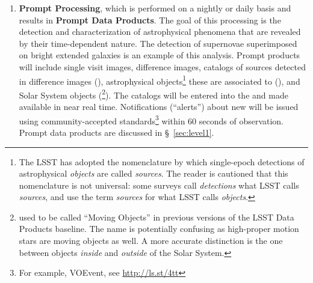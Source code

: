 \begin{enumerate}
    \item \textbf{Prompt Processing}, which is performed on a nightly or daily basis and results in \textbf{Prompt Data Products}. The goal of this processing is the detection and characterization of astrophysical phenomena that are revealed by their time-dependent nature. The detection of supernovae superimposed on bright extended galaxies is an example of this analysis.  Prompt products will include single visit images, difference images, catalogs of sources detected in difference images (\DIASources), astrophysical objects\footnote{The LSST has adopted the nomenclature by which single-epoch detections of astrophysical \emph{objects} are called \emph{sources}. The reader is cautioned that this nomenclature is not universal: some surveys call \emph{detections} what LSST calls \emph{sources}, and use the term \emph{sources} for what LSST calls \emph{objects}.} these are associated to (\DIAObjects), and Solar System objects (\SSObjects\footnote{\SSObjects used to be called ``Moving Objects'' in previous versions of the LSST Data Products baseline. The name is potentially confusing as high-proper motion stars are moving objects as well. A more accurate distinction is the one between objects \emph{inside} and \emph{outside} of the Solar System.}). The catalogs will be entered into the \textbf{\PPDB} and made available in near real time. Notifications (``alerts'') about new \DIASources will be issued using community-accepted
standards\footnote{For example, VOEvent, see \url{http://ls.st/4tt}} within 60 seconds of observation. Prompt data products are discussed in \S~\ref{sec:level1}.


\end{enumerate}
